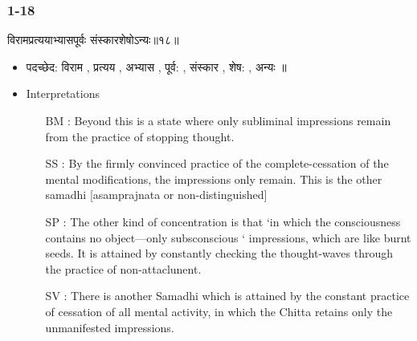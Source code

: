 \begin{frame}[fragile]\frametitle{1-18}
\begin{sanskrit}
विरामप्रत्ययाभ्यासपूर्वः संस्कारशेषोऽन्यः॥१८॥
\end{sanskrit}

	\begin{itemize}
	\item पदच्छेद: विराम , प्रत्यय , अभ्यास , पूर्व: , संस्कार , शेष: , अन्यः ॥
	\item Interpretations
		\begin{itemize}	
		\item [BM]: Beyond this is a state where only subliminal impressions remain from the practice of stopping thought.
		\item [SS]: By the firmly convinced practice of the complete-cessation of the mental modifications, the impressions only remain. This is the other samadhi [asamprajnata or non-distinguished]
		\item [SP]: The other kind of concentration is that ‘in which the consciousness contains no object—only subsconscious ‘ impressions, which are like burnt seeds. It is attained by constantly checking the thought-waves through the practice of non-attaclunent.
		\item [SV]: There is another Samadhi which is attained by the constant practice of cessation of all mental activity, in which the Chitta retains only the unmanifested impressions. 
		\end{itemize}
	\end{itemize}
	
\end{frame}


